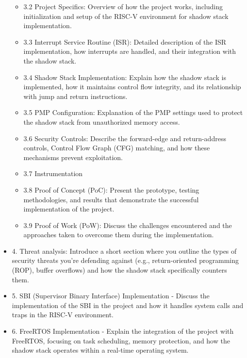 \begin{itemize}
\begin{itemize}
      \item 3.2 Project Specifics: Overview of how the project works, including initialization
        and setup of the RISC-V environment for shadow stack implementation.

      \item 3.3 Interrupt Service Routine (ISR): Detailed description of the ISR
        implementation, how interrupts are handled, and their integration with
        the shadow stack.

      \item 3.4 Shadow Stack Implementation: Explain how the shadow stack is
        implemented, how it maintains control flow integrity, and its
        relationship with jump and return instructions.

      \item 3.5 PMP Configuration: Explanation of the PMP settings used to
        protect the shadow stack from unauthorized memory access.

      \item 3.6 Security Controls: Describe the forward-edge and return-address
        controls, Control Flow Graph (CFG) matching, and how these mechanisms
        prevent exploitation.

      \item 3.7 Instrumentation

      \item 3.8 Proof of Concept (PoC): Present the prototype, testing methodologies,
        and results that demonstrate the successful implementation of the
        project.

      \item 3.9 Proof of Work (PoW): Discuss the challenges encountered and the
        approaches taken to overcome them during the implementation.
    \end{itemize}

  \item 4. Threat analysis: Introduce a short section where you outline the
    types of security threats you’re defending against (e.g., return-oriented programming
    (ROP), buffer overflows) and how the shadow stack specifically counters them.

  \item 5. SBI (Supervisor Binary Interface) Implementation - Discuss the implementation
    of the SBI in the project and how it handles system calls and traps in the RISC-V
    environment.

  \item 6. FreeRTOS Implementation - Explain the integration of the project with
    FreeRTOS, focusing on task scheduling, memory protection, and how the shadow
    stack operates within a real-time operating system.


\end{itemize}
